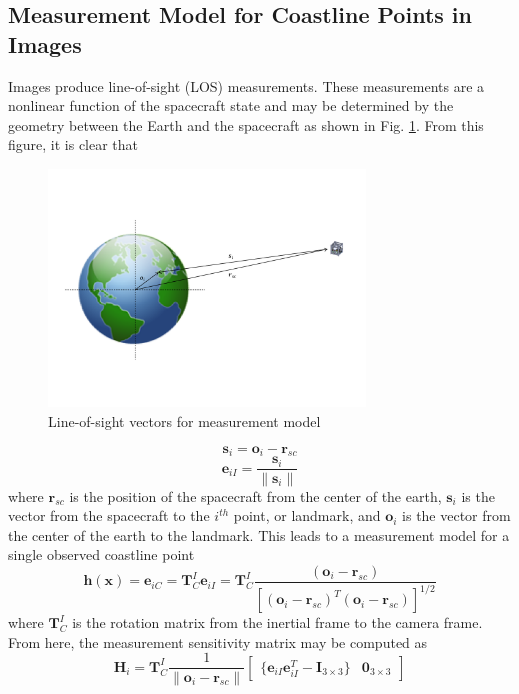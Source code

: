 \documentclass[]{aiaa-tc}%
\begin{document}

\subsection{Measurement Model for Coastline Points in Images}
Images produce line-of-sight (LOS) measurements.  These measurements are a nonlinear function of the spacecraft state and may be determined by the geometry between the Earth and the spacecraft as shown in Fig. \ref{fig:LOSgeometry}.  From this figure, it is clear that 
%
\begin{figure}[t!]
\centering
\includegraphics[width=0.75\textwidth,trim=0.8in 1.5in 0.3in 1in,clip]{LOSgeometry} %
\caption{Line-of-sight vectors for measurement model}
\label{fig:LOSgeometry}
\end{figure}
%
\begin{equation} \label{eq:s}
\textbf{s}_i=\textbf{o}_i-\textbf{r}_{sc}
\end{equation}
%
\begin{equation} \label{eq:eii}
\textbf{e}_{iI}=\frac{\textbf{s}_i}{\|\textbf{s}_i\|}
\end{equation}
%
where $\textbf{r}_{sc}$ is the position of the spacecraft from the center of the earth, $\textbf{s}_i$ is the vector from the spacecraft to the $i^{th}$ point, or landmark, and $\textbf{o}_i$ is the vector from the center of the earth to the landmark.  This leads to a measurement model for a single observed coastline point
%
\begin{equation} \label{eq:littleh}
\textbf{h}(\textbf{x})=\textbf{e}_{iC}=\textbf{T}_{C}^I\textbf{e}_{iI}=\textbf{T}_{C}^I\frac{(\textbf{o}_{i}-\textbf{r}_{sc})}{[(\textbf{o}_{i}-\textbf{r}_{sc})^T(\textbf{o}_{i}-\textbf{r}_{sc})]^{1/2}}
\end{equation}
%
where $\textbf{T}_C^I$ is the rotation matrix from the inertial frame to the camera frame.  From here, the measurement sensitivity matrix may be computed as
%
\begin{equation}
\label{eq:H}
\textbf{H}_{i}=\textbf{T}_{C}^I\frac{1}{\|\textbf{o}_i-\textbf{r}_{sc}\|}
\left[\begin{matrix}
\{\textbf{e}_{iI}\textbf{e}_{iI}^T-\textbf{I}_{3\times3}\} & \textbf{0}_{3\times3}
\end{matrix}\right]
\end{equation}
%
\end{document}
